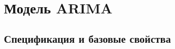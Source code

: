 \documentclass[12pt]{article}
\theoremstyle{remark}
\newtheorem{exercise}{}[subsection]
\begin{document}


\section{Модель ARIMA}

\subsection{Спецификация и базовые свойства}
\end{document}
